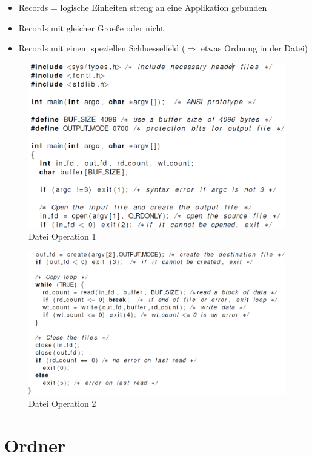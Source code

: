 \documentclass[a4paper]{scrreprt}
\begin{document}
\begin{itemize}
	\item Records = logische Einheiten streng an eine Applikation gebunden
	\item Records mit gleicher Groeße oder nicht
	\item Records mit einem speziellen Schluesselfeld ($\Rightarrow$ etwas Ordnung in der Datei)
\end{itemize}

\begin{figure}[ht]
\centering
\includegraphics[scale=0.4]{graphics/file_operation.png}
\caption{Datei Operation 1}
\end{figure}

\begin{figure}[ht]
\centering
\includegraphics[scale=0.4]{graphics/file_operation2.png}
\caption{Datei Operation 2}
\end{figure}

\section{Ordner}
\end{document}
